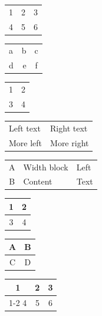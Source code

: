 \documentclass{article}
\begin{document}
\begin{tabular}{ccc}
  1 & 2 & 3 \\
  4 & 5 & 6 \\
\end{tabular}

\begin{tabular}{|l|r|c|}
  a & b & c \\
  d & e & f \\
\end{tabular}

\begin{tabular}{||c||c||}
  1 & 2 \\
  3 & 4 \\
\end{tabular}

\begin{tabular}{p{3cm}p{4.5cm}}
  Left text & Right text \\
  More left & More right \\
\end{tabular}

\begin{tabular}{|c|p{2cm}|l|}
  A & Width block & Left \\
  B & Content & Text \\
\end{tabular}

\begin{tabular}{cc}
  \hline
  1 & 2 \\
  \hline
  3 & 4 \\
  \hline
\end{tabular}

\begin{tabular}{cc}
  \hline\hline
  A & B \\
  \hline\hline
  C & D \\
\end{tabular}

\begin{tabular}{ccc}
  1 & 2 & 3 \\
  \cline{1-2}
  4 & 5 & 6 \\
\end{tabular}
\end{document}
